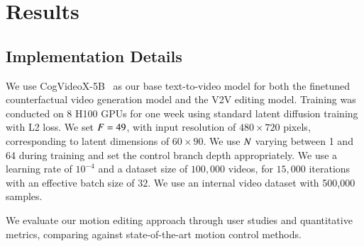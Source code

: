 \newcommand{\NumParticipants}{41}

\newcommand{\OursQOne}{70}
\newcommand{\ATIQOne}{24}
\newcommand{\ReVideoQOne}{1}
\newcommand{\GWTFQOne}{5}

\newcommand{\OursQTwo}{71}
\newcommand{\ATIQTwo}{24}
\newcommand{\ReVideoQTwo}{2}
\newcommand{\GWTFQTwo}{3}

\newcommand{\OursQThree}{69}
\newcommand{\ATIQThree}{25}
\newcommand{\ReVideoQThree}{1}
\newcommand{\GWTFQThree}{5}

\newcommand{\pct}[1]{\fpeval{#1/100}}

\section{Results}
\label{mv2v_sec:experiments}

\subsection{Implementation Details}

We use CogVideoX-5B~\cite{cogvideox2024} as our base text-to-video model for both the finetuned counterfactual video generation model and the V2V editing model.
Training was conducted on 8 H100 GPUs for one week using standard latent diffusion training with L2 loss.
We set $F = 49$,
with input resolution of $480 \times 720$ pixels,
corresponding to latent dimensions of $60 \times 90$.
We use $N$ varying between 1 and 64 during training and set the control branch depth appropriately.
We use a learning rate of $10^{-4}$ and a dataset size of $100,000$ videos,
for $15,000$ iterations with an effective batch size of $32$.
We use an internal video dataset with 500,000 samples.

\newcommand{\Vtest}{V_{\text{test}}}     %
\newcommand{\Vzero}{V_0}                 %
\newcommand{\Vone}{V_1}                  %
\newcommand{\Voneprime}{V_1'}            %
\newcommand{\Ntest}{N_{\text{test}}}     %
\newcommand{\Npoints}{N_{\text{points}}} %

We evaluate our motion editing approach through user studies and quantitative metrics, comparing against state-of-the-art motion control methods.

